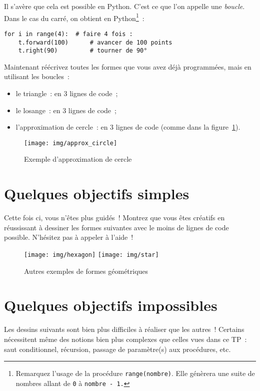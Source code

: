 \documentclass[11pt,a4paper]{article}
\begin{document}
Il s'avère que cela est possible en Python. C'est ce que l'on appelle une
\emph{boucle}. Dans le cas du carré, on obtient en Python\footnote{Remarquez
l'usage de la procédure \lstinline{range(nombre)}. Elle génèrera une suite de
nombres allant de \lstinline{0} à \lstinline{nombre - 1.}}~:

\begin{lstlisting}
for i in range(4):  # faire 4 fois :
    t.forward(100)      # avancer de 100 points
    t.right(90)         # tourner de 90°
\end{lstlisting}

Maintenant réécrivez toutes les formes que vous avez déjà programmées, mais en
utilisant les boucles~:

\begin{itemize}
\item le triangle~: en 3 lignes de code~;
\item le losange~: en 3 lignes de code~;
\item l'approximation de cercle~: en 3 lignes de code (comme dans la
    figure~\ref{fig:circle}).
\end{itemize}

\begin{figure}
    \centering
    \texttt{[image: img/approx\_circle]}
    \caption{Exemple d'approximation de cercle}
    \label{fig:circle}
\end{figure}

\section{Quelques objectifs simples}
Cette fois ci, vous n'êtes plus guidés~! Montrez que vous êtes créatifs en
réussissant à dessiner les formes suivantes avec le moins de lignes de code
possible. N'hésitez pas à appeler à l'aide~!

\begin{figure}[H]
    \centering
    \texttt{[image: img/hexagon]}
    \texttt{[image: img/star]}
    \caption{Autres exemples de formes géométriques}
    \label{fig:ending_examples}
\end{figure}

\section{Quelques objectifs impossibles}

Les dessins suivants sont bien plus difficiles à réaliser que les autres~!
Certains nécessitent même des notions bien plus complexes que celles vues dans
ce TP~: saut conditionnel, récursion, passage de paramètre(s) aux procédures, etc.
\end{document}

